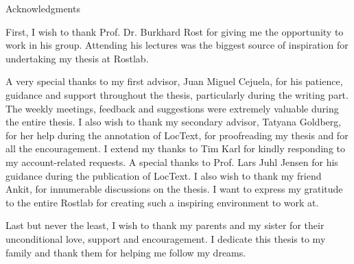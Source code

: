\thispagestyle{empty}

\vspace*{2cm}

\begin{center}
{ Acknowledgments}
\end{center}

\vspace{1cm}

First, I wish to thank Prof. Dr. Burkhard Rost for giving me the opportunity to work in his group. Attending his lectures was the biggest source of inspiration for undertaking my thesis at Rostlab.

A very special thanks to my first advisor, Juan Miguel Cejuela, for his patience, guidance and support throughout the thesis, particularly during the writing part. The weekly meetings, feedback and suggestions were extremely valuable during the entire thesis. I also wish to thank my secondary advisor, Tatyana Goldberg, for her help during the annotation of LocText, for proofreading my thesis and for all the encouragement. I extend my thanks to Tim Karl for kindly responding to my account-related requests. A special thanks to Prof. Lars Juhl Jensen for his guidance during the publication of LocText. I also wish to thank my friend Ankit, for innumerable discussions on the thesis. I want to express my gratitude to the entire Rostlab for creating such a inspiring environment to work at.

Last but never the least, I wish to thank my parents and my sister for their unconditional love, support and encouragement. I dedicate this thesis to my family and thank them for helping me follow my dreams.


\cleardoublepage{}
